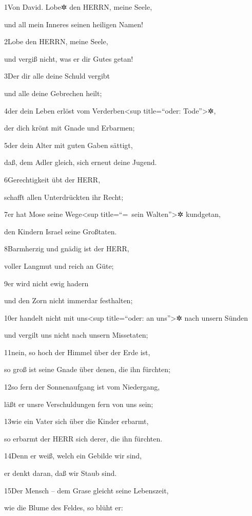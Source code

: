 1Von David. Lobe✲ den HERRN, meine Seele,

und all mein Inneres seinen heiligen Namen!

2Lobe den HERRN, meine Seele,

und vergiß nicht, was er dir Gutes getan!

3Der dir alle deine Schuld vergibt

und alle deine Gebrechen heilt;

4der dein Leben erlöst vom Verderben\textless sup title=``oder:
Tode''\textgreater✲,

der dich krönt mit Gnade und Erbarmen;

5der dein Alter mit guten Gaben sättigt,

daß, dem Adler gleich, sich erneut deine Jugend.

6Gerechtigkeit übt der HERR,

schafft allen Unterdrückten ihr Recht;

7er hat Mose seine Wege\textless sup title=``=~sein
Walten''\textgreater✲ kundgetan,

den Kindern Israel seine Großtaten.

8Barmherzig und gnädig ist der HERR,

voller Langmut und reich an Güte;

9er wird nicht ewig hadern

und den Zorn nicht immerdar festhalten;

10er handelt nicht mit uns\textless sup title=``oder: an
uns''\textgreater✲ nach unsern Sünden

und vergilt uns nicht nach unsern Missetaten;

11nein, so hoch der Himmel über der Erde ist,

so groß ist seine Gnade über denen, die ihn fürchten;

12so fern der Sonnenaufgang ist vom Niedergang,

läßt er unsre Verschuldungen fern von uns sein;

13wie ein Vater sich über die Kinder erbarmt,

so erbarmt der HERR sich derer, die ihn fürchten.

14Denn er weiß, welch ein Gebilde wir sind,

er denkt daran, daß wir Staub sind.

15Der Mensch -- dem Grase gleicht seine Lebenszeit,

wie die Blume des Feldes, so blüht er:

